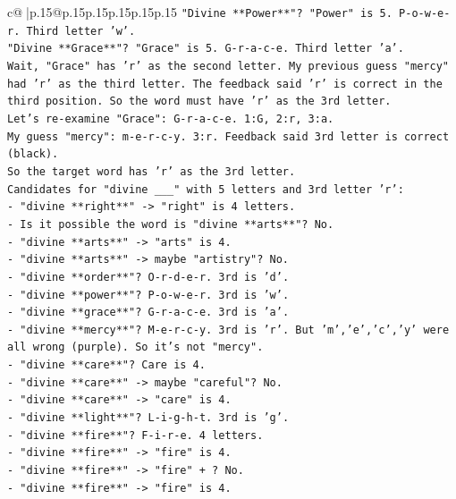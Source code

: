 \documentclass{article}
\begin{document}
{\begin{supertabular}{c@{$\;$}|p{.15\linewidth}@{}p{.15\linewidth}p{.15\linewidth}p{.15\linewidth}p{.15\linewidth}p{.15\linewidth}}
{{{\texttt{"Divine **Power**"? "Power" is 5. P{-}o{-}w{-}e{-}r. Third letter 'w'.} \\
\texttt{"Divine **Grace**"? "Grace" is 5. G{-}r{-}a{-}c{-}e. Third letter 'a'.} \\
\texttt{Wait, "Grace" has 'r' as the second letter. My previous guess "mercy" had 'r' as the third letter. The feedback said 'r' is correct in the third position. So the word must have 'r' as the 3rd letter.} \\
\texttt{Let's re{-}examine "Grace": G{-}r{-}a{-}c{-}e. 1:G, 2:r, 3:a.} \\
\texttt{My guess "mercy": m{-}e{-}r{-}c{-}y. 3:r. Feedback said 3rd letter is correct (black).} \\
\texttt{So the target word has 'r' as the 3rd letter.} \\
\texttt{Candidates for "divine \_\_\_" with 5 letters and 3rd letter 'r':} \\
\texttt{{-} "divine **right**" {-}> "right" is 4 letters.} \\
\texttt{{-} Is it possible the word is "divine **arts**"? No.} \\
\texttt{{-} "divine **arts**" {-}> "arts" is 4.} \\
\texttt{{-} "divine **arts**" {-}> maybe "artistry"? No.} \\
\texttt{{-} "divine **order**"? O{-}r{-}d{-}e{-}r. 3rd is 'd'.} \\
\texttt{{-} "divine **power**"? P{-}o{-}w{-}e{-}r. 3rd is 'w'.} \\
\texttt{{-} "divine **grace**"? G{-}r{-}a{-}c{-}e. 3rd is 'a'.} \\
\texttt{{-} "divine **mercy**"? M{-}e{-}r{-}c{-}y. 3rd is 'r'. But 'm','e','c','y' were all wrong (purple). So it's not "mercy".} \\
\texttt{{-} "divine **care**"? Care is 4.} \\
\texttt{{-} "divine **care**" {-}> maybe "careful"? No.} \\
\texttt{{-} "divine **care**" {-}> "care" is 4.} \\
\texttt{{-} "divine **light**"? L{-}i{-}g{-}h{-}t. 3rd is 'g'.} \\
\texttt{{-} "divine **fire**"? F{-}i{-}r{-}e. 4 letters.} \\
\texttt{{-} "divine **fire**" {-}> "fire" is 4.} \\
\texttt{{-} "divine **fire**" {-}> "fire" + ? No.} \\
\texttt{{-} "divine **fire**" {-}> "fire" is 4.} \\
}}}
\end{supertabular}}
\end{document}
